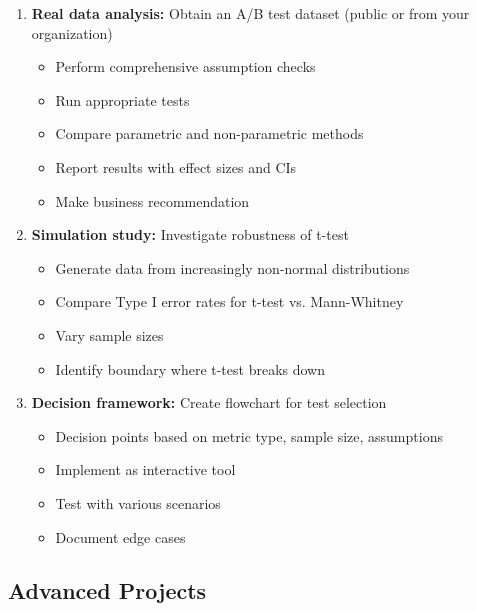 \begin{enumerate}
    \item \textbf{Real data analysis:} Obtain an A/B test dataset (public or from your organization)
    \begin{itemize}
        \item Perform comprehensive assumption checks
        \item Run appropriate tests
        \item Compare parametric and non-parametric methods
        \item Report results with effect sizes and CIs
        \item Make business recommendation
    \end{itemize}

    \item \textbf{Simulation study:} Investigate robustness of t-test
    \begin{itemize}
        \item Generate data from increasingly non-normal distributions
        \item Compare Type I error rates for t-test vs. Mann-Whitney
        \item Vary sample sizes
        \item Identify boundary where t-test breaks down
    \end{itemize}

    \item \textbf{Decision framework:} Create flowchart for test selection
    \begin{itemize}
        \item Decision points based on metric type, sample size, assumptions
        \item Implement as interactive tool
        \item Test with various scenarios
        \item Document edge cases
    \end{itemize}
\end{enumerate}

\subsection{Advanced Projects}

